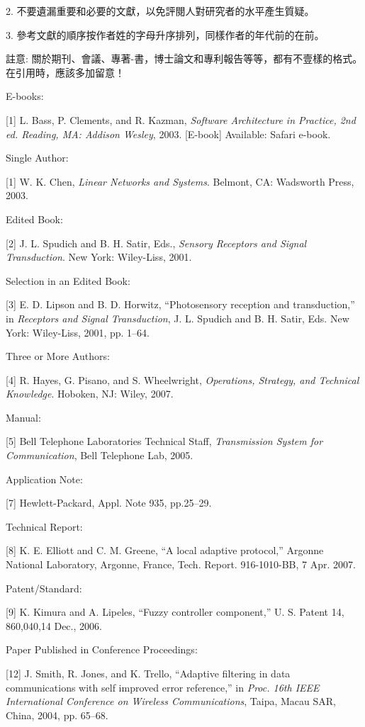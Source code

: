 2. 不要遺漏重要和必要的文獻，以免評閱人對研究者的水平產生質疑。

3. 參考文獻的順序按作者姓的字母升序排列，同樣作者的年代前的在前。

註意: 關於期刊、會議、專著-書，博士論文和專利報告等等，都有不壹樣的格式。在引用時，應該多加留意！


E-books:

[1] L. Bass, P. Clements, and R. Kazman, {\em Software Architecture
in Practice, 2nd ed. Reading, MA: Addison Wesley}, 2003.
[E-book] Available: Safari e-book.

Single Author:

[1] W. K. Chen, {\em Linear Networks and Systems}. Belmont, CA:
Wadsworth Press, 2003.

Edited Book:

[2] J. L. Spudich and B. H. Satir, Eds., {\em Sensory Receptors and
Signal Transduction}. New York: Wiley-Liss, 2001.

Selection in an Edited Book:

[3] E. D. Lipson and B. D. Horwitz, ``Photosensory reception and
transduction,'' in {\em Receptors and Signal Transduction}, J. L.
Spudich and B. H. Satir, Eds. New York: Wiley-Liss, 2001, pp.
1–64.

Three or More Authors:

[4] R. Hayes, G. Pisano, and S. Wheelwright, {\em Operations,
Strategy, and Technical Knowledge}. Hoboken, NJ: Wiley, 2007.


Manual:

[5] Bell Telephone Laboratories Technical Staff, {\em Transmission
System for Communication}, Bell Telephone Lab, 2005.

Application Note:

[7] Hewlett-Packard, Appl. Note 935, pp.25–29.

Technical Report:

[8] K. E. Elliott and C. M. Greene, ``A local adaptive protocol,''
Argonne National Laboratory, Argonne, France, Tech. Report.
916-1010-BB, 7 Apr. 2007.

Patent/Standard:

[9] K. Kimura and A. Lipeles, ``Fuzzy controller component,'' U.
S. Patent 14, 860,040,14 Dec., 2006.

Paper Published in Conference Proceedings:

[12] J. Smith, R. Jones, and K. Trello, ``Adaptive filtering in data
communications with self improved error reference,'' in {\em Proc.
16th IEEE International Conference on Wireless
Communications}, Taipa, Macau SAR, China, 2004, pp. 65–68.

